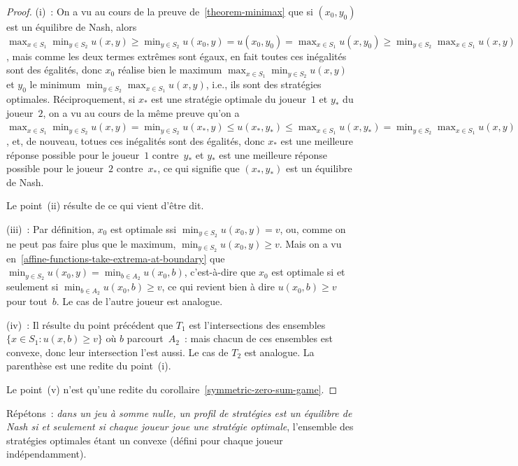 \documentclass[12pt,a4paper]{article}
\theoremstyle{definition}
\begin{document}
\begin{proof}
(i) : On a vu au cours de la preuve de \ref{theorem-minimax} que si
  $(x_0,y_0)$ est un équilibre de Nash, alors $\max_{x\in S_1}
  \min_{y\in S_2} u(x,y) \geq \min_{y\in S_2} u(x_0,y) = u(x_0,y_0) =
  \max_{x\in S_1} u(x,y_0) \geq \min_{y\in S_2} \max_{x\in S_1}
  u(x,y)$, mais comme les deux termes extrêmes sont égaux, en fait
  toutes ces inégalités sont des égalités, donc $x_0$ réalise bien le
  maximum $\max_{x\in S_1} \min_{y\in S_2} u(x,y)$ et $y_0$ le minimum
  $\min_{y\in S_2} \max_{x\in S_1} u(x,y)$, i.e., ils sont des
  stratégies optimales.  Réciproquement, si $x_*$ est une stratégie
  optimale du joueur $1$ et $y_*$ du joueur $2$, on a vu au cours de
  la même preuve qu'on a $\max_{x\in S_1} \min_{y\in S_2} u(x,y) =
  \min_{y\in S_2} u(x_*,y) \leq u(x_*,y_*) \leq \max_{x\in S_1}
  u(x,y_*) = \min_{y\in S_2} \max_{x\in S_1} u(x,y)$, et, de nouveau,
  totues ces inégalités sont des égalités, donc $x_*$ est une
  meilleure réponse possible pour le joueur $1$ contre $y_*$ et $y_*$
  est une meilleure réponse possible pour le joueur $2$ contre $x_*$,
  ce qui signifie que $(x_*,y_*)$ est un équilibre de Nash.

Le point (ii) résulte de ce qui vient d'être dit.

(iii) : Par définition, $x_0$ est optimale ssi $\min_{y\in S_2}
u(x_0,y) = v$, ou, comme on ne peut pas faire plus que le maximum,
$\min_{y\in S_2} u(x_0,y) \geq v$.  Mais on a vu
en \ref{affine-functions-take-extrema-at-boundary} que $\min_{y\in
  S_2} u(x_0,y) = \min_{b\in A_2} u(x_0,b)$, c'est-à-dire que $x_0$
est optimale si et seulement si $\min_{b\in A_2} u(x_0,b) \geq v$, ce
qui revient bien à dire $u(x_0,b) \geq v$ pour tout $b$.  Le cas de
l'autre joueur est analogue.

(iv) : Il résulte du point précédent que $T_1$ est l'intersections des
ensembles $\{x \in S_1 : u(x,b)\geq v\}$ où $b$ parcourt $A_2$ : mais
chacun de ces ensembles est convexe, donc leur intersection l'est
aussi.  Le cas de $T_2$ est analogue.  La parenthèse est une redite du
point (i).

Le point (v) n'est qu'une redite du
corollaire \ref{symmetric-zero-sum-game}.
\end{proof}

Répétons : \emph{dans un jeu à somme nulle, un profil de stratégies
  est un équilibre de Nash si et seulement si chaque joueur joue une
  stratégie optimale}, l'ensemble des stratégies optimales étant un
convexe (défini pour chaque joueur indépendamment).
\end{document}
